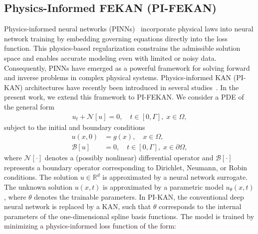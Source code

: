\documentclass{article}
\begin{document}
\subsection{Physics-Informed FEKAN (PI-FEKAN)}
\label{sec:pifekan}
Physics-informed neural networks (PINNs)~\cite{raissi2019physics,jagtap2020adaptive,jagtap2022deepknn,jagtap2020conservative,abbasi2025history,jagtap2022deepWW,penwarden2023unified,shukla2021parallel,mao2020physics,shukla2021physics,jagtap2022physics,hu2021extended,jagtap2020locally,jagtap2023important,jagtap2020extended} incorporate physical laws into neural network training by embedding governing equations directly into the loss function. This physics-based regularization constrains the admissible solution space and enables accurate modeling even with limited or noisy data. Consequently, PINNs have emerged as a powerful framework for solving forward and inverse problems in complex physical systems. Physics-informed KAN (PI-KAN) architectures have recently been introduced in several studies~\cite{wang2025kolmogorov,zhao2025pikan,guo2025physics,shukla2024comprehensive}. In the present work, we extend this framework to PI-FEKAN. We consider a PDE of the general form
\begin{align}
\label{eq:pde}
u_t + \mathcal{N}[u] = 0, \quad t \in [0,\Gamma], \; x \in \Omega,
\end{align}
subject to the initial and boundary conditions
\begin{align}
u(x,0) &= g(x), \quad x \in \Omega, \\
\mathcal{B}[u] &= 0, \quad t \in [0,\Gamma], \; x \in \partial\Omega,
\end{align}
where $\mathcal{N}[\cdot]$ denotes a (possibly nonlinear) differential operator and $\mathcal{B}[\cdot]$ represents a boundary operator corresponding to Dirichlet, Neumann, or Robin conditions. The solution $u \in \mathbb{R}^d$ is approximated by a neural network surrogate. The unknown solution $u(x,t)$ is approximated by a parametric model $u_{\theta}(x,t)$, where $\theta$ denotes the trainable parameters. In PI-KAN, the conventional deep neural network is replaced by a KAN, such that $\theta$ corresponds to the internal parameters of the one-dimensional spline basis functions. The model is trained by minimizing a physics-informed loss function of the form:
\end{document}
